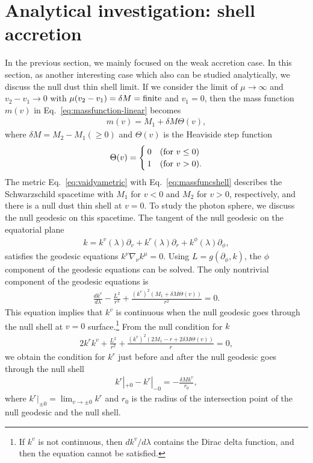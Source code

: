 \documentclass[prd,showpacs,preprintnumbers,groupedaddress,superscriptaddress,nofootinbib,11pt]{revtex4-1} %
\theoremstyle{newplain}
\begin{document}
\section{Analytical investigation: shell accretion}
\label{sec:analytical-shell}
In the previous section, we mainly focused on the weak accretion case. In this section, as another interesting case which also can be studied analytically, we discuss the null dust thin shell limit.
If we consider the limit of $\mu \to \infty$ and $v_2 - v_1 \to 0$ with $\mu(v_2-v_1) = \delta M = {\rm finite}$ and $v_1=0$, then the mass function $m(v)$ in Eq.~\eqref{eq:massfunction-linear} becomes
\begin{align}
m(v) = M_1 + \delta M \Theta(v),
\label{eq:massfuncshell}
\end{align}
where 
$\delta M = M_2-M_1 (\ge 0)$ and
$\Theta(v)$ is the Heaviside step function
\begin{align}
    \Theta(v) = 
\begin{cases}
  0 & ({\rm for}~v \le 0)
\\ 
  1 & ({\rm for}~v > 0).
\end{cases}
\end{align}
The metric Eq.~\eqref{eq:vaidyametric} with Eq.~\eqref{eq:massfuncshell} describes
the Schwarzschild spacetime with $M_1$ for $v<0$ and $M_2$ for $v>0$, respectively,
and there is a null dust thin shell at $v = 0$.
To study the photon sphere, we discuss the null geodesic on this spacetime.
The tangent of the null geodesic on the equatorial plane 
\begin{align}
k = k^v(\lambda) \partial_v + k^r(\lambda) \partial_r + k^\phi(\lambda) \partial_\phi,
\end{align}
satisfies the geodesic equations $k^\nu \nabla_\nu k^\mu = 0$.
Using $L = g(\partial_\phi, k)$, the $\phi$ component of the geodesic equations can be solved.
The only nontrivial component of the geodesic equations is
\begin{align}
\frac{dk^v}{d\lambda} - \frac{L^2}{r^3} + \frac{(k^v)^2(M_1 + \delta M \Theta(v))}{r^2} =0.
\end{align}
This equation implies that $k^v$ is continuous when the null geodesic goes through the null shell at $v = 0$ surface.\footnote{
If $k^v$ is not continuous, then $dk^v/d\lambda$ contains the Dirac delta function, and then the equation cannot be satisfied.
}
{}From the null condition for $k$
\begin{align}
2 k^r k^v 
+ 
\frac{L^2}{r^2}
+
\frac{(k^v)^2 (2 M_1 - r + 2 \delta M \Theta(v))}{r} = 0,
\end{align}
we obtain the condition for $k^r$ just before and after the null geodesic goes through the null shell
\begin{align}
k^r|_{+0} - k^r|_{-0} = - \frac{\delta M k^v}{r_0},
\label{eq:discontinuity-kr}
\end{align}
where $k^r|_{\pm 0} = \lim_{v \to \pm 0}k^r$ and $r_0$ is the radius of the intersection point of the null geodesic and the null shell.
\end{document}
